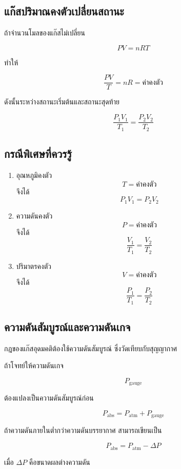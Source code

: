 \subsection{แก๊สปริมาณคงตัวเปลี่ยนสถานะ}

ถ้าจำนวนโมลของแก๊สไม่เปลี่ยน

\[
PV=nRT
\]

ทำให้

\[
\frac{PV}{T}=nR=\text{ค่าคงตัว}
\]

ดังนั้นระหว่างสถานะเริ่มต้นและสถานะสุดท้าย

\[
\boxed{
\frac{P_1V_1}{T_1}
=
\frac{P_2V_2}{T_2}
}
\]

\subsection{กรณีพิเศษที่ควรรู้}

\begin{enumerate}
    \item อุณหภูมิคงตัว
    \[
    T=\text{ค่าคงตัว}
    \]
    จึงได้
    \[
    \boxed{P_1V_1=P_2V_2}
    \]

    \item ความดันคงตัว
    \[
    P=\text{ค่าคงตัว}
    \]
    จึงได้
    \[
    \boxed{\frac{V_1}{T_1}=\frac{V_2}{T_2}}
    \]

    \item ปริมาตรคงตัว
    \[
    V=\text{ค่าคงตัว}
    \]
    จึงได้
    \[
    \boxed{\frac{P_1}{T_1}=\frac{P_2}{T_2}}
    \]
\end{enumerate}

\subsection{ความดันสัมบูรณ์และความดันเกจ}

กฎของแก๊สอุดมคติต้องใช้ความดันสัมบูรณ์ ซึ่งวัดเทียบกับสุญญากาศ

ถ้าโจทย์ให้ความดันเกจ

\[
P_{\text{gauge}}
\]

ต้องแปลงเป็นความดันสัมบูรณ์ก่อน

\[
\boxed{
P_{\text{abs}}
=
P_{\text{atm}}
+
P_{\text{gauge}}
}
\]

ถ้าความดันภายในต่ำกว่าความดันบรรยากาศ สามารถเขียนเป็น

\[
P_{\text{abs}}
=
P_{\text{atm}}-\Delta P
\]

เมื่อ $\Delta P$ คือขนาดผลต่างความดัน

